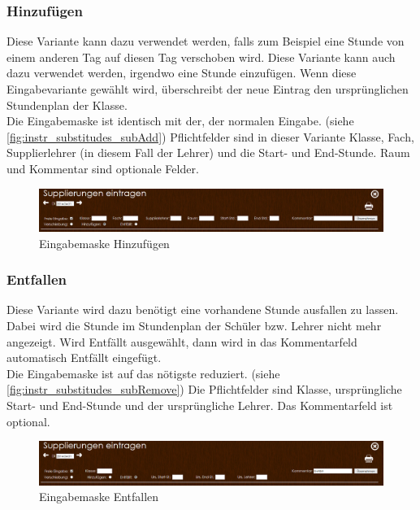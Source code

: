 \subsubsection{Hinzufügen}\label{sec:instr_admin_sub_add}
Diese Variante kann dazu verwendet werden, falls zum Beispiel eine Stunde von einem anderen Tag auf diesen Tag verschoben wird. Diese Variante kann auch dazu verwendet werden, irgendwo eine Stunde einzufügen. Wenn diese Eingabevariante gewählt wird, überschreibt der neue Eintrag den ursprünglichen Stundenplan der Klasse.\\
Die Eingabemaske ist identisch mit der, der normalen Eingabe. (siehe \autoref{fig:instr_substitudes_subAdd}) Pflichtfelder sind in dieser Variante Klasse, Fach, Supplierlehrer (in diesem Fall der Lehrer) und die Start- und End-Stunde. Raum und Kommentar sind optionale Felder.
\begin{figure}[H]
\centering
\includegraphics[keepaspectratio=true, width=17cm]{images/screenshots/substitudes_add.png}
\caption{Eingabemaske Hinzufügen}
\label{fig:instr_substitudes_subAdd}
\end{figure}
\subsubsection{Entfallen}\label{sec:instr_admin_sub_remove}
Diese Variante wird dazu benötigt eine vorhandene Stunde ausfallen zu lassen. Dabei wird die Stunde im Stundenplan der Schüler bzw. Lehrer nicht mehr angezeigt. Wird Entfällt ausgewählt, dann wird in das Kommentarfeld automatisch Entfällt eingefügt.\\
Die Eingabemaske ist auf das nötigste reduziert. (siehe \autoref{fig:instr_substitudes_subRemove}) Die Pflichtfelder sind Klasse, ursprüngliche Start- und End-Stunde und der ursprüngliche Lehrer. Das Kommentarfeld ist optional.
\begin{figure}[H]
\centering
\includegraphics[keepaspectratio=true, width=17cm]{images/screenshots/substitudes_remove.png}
\caption{Eingabemaske Entfallen}
\label{fig:instr_substitudes_subRemove}
\end{figure}
